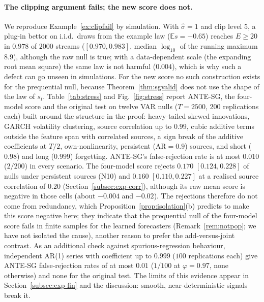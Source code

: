 \documentclass[pdflatex,sn-mathphys-ay]{sn-jnl}%
\theoremstyle{thmstyleone}%
\theoremstyle{thmstyletwo}%
\theoremstyle{thmstylethree}%
\newcommand{\E}{\mathbb{E}}
\begin{document}
\paragraph{The clipping argument fails; the new score does not.} We reproduce Example~\ref{ex:clipfail} by
simulation. With $\hat\sigma=1$ and clip level $5$, a plug-in bettor on i.i.d.\ draws from the example law
($\E s=-0.65$) reaches $E\ge20$ in $0.978$ of $2000$ streams ($[0.970,0.983]$, median $\log_{10}$ of the running
maximum $8.9$), although the raw null is true; with a data-dependent scale (the expanding root mean square) the same
law is not harmful ($0.004$), which is why such a defect can go unseen in simulations.
For the new score no such construction exists for the prequential null, because Theorem~\ref{thm:sgvalid} does not use the shape of the law of $s_t$.
Table~\ref{tab:stress} and Fig.~\ref{fig:stress} report ANTE-SG, the four-model score and the original test on twelve
VAR nulls ($T=2500$, $200$ replications each) built around the structure in the proof: heavy-tailed skewed
innovations, GARCH volatility clustering, source correlation up to $0.99$, cubic additive terms outside the feature span
with correlated sources, a sign break of the additive coefficients at $T/2$, own-nonlinearity, persistent ($\mathrm{AR}=0.9$)
sources, and short ($0.98$) and long ($0.999$) forgetting. ANTE-SG's false-rejection rate is at most $0.010$ ($2/200$) in every
scenario. The four-model score rejects $0.170$ $[0.124,0.228]$ of nulls under persistent sources (N10)
and $0.160$ $[0.110,0.227]$ at a realised source correlation of $0.20$ (Section~\ref{subsec:exp-corr}), although its raw mean score is negative in those cells (about $-0.004$ and $-0.02$). The rejections therefore do not
come from redundancy, which Proposition~\ref{prop:isolation}(b) predicts to make this score negative here; they indicate that the prequential null of the four-model score fails in finite samples for the learned forecasters (Remark~\ref{rem:notpop}; we have not isolated the cause), another reason to prefer the add-versus-joint contrast.
As an additional check against spurious-regression behaviour, independent AR(1) series with coefficient up to $0.999$ ($100$
replications each) give ANTE-SG false-rejection rates of at most $0.01$ ($1/100$ at $\varphi=0.97$, none otherwise) and none for the original test.
The limits of this evidence appear in Section~\ref{subsec:exp-fin} and the discussion: smooth, near-deterministic signals break it.
\end{document}
